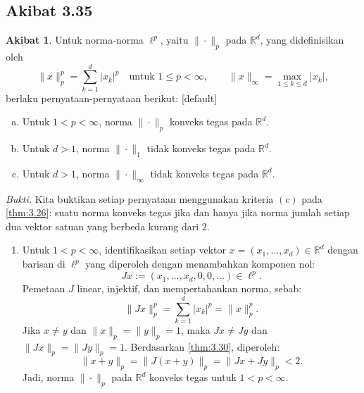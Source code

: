 \documentclass[aspectratio=169,11pt]{beamer}
\theoremstyle{definition}
\newtheorem{akibat}{Akibat}
\newcommand{\myref}[1]{\hyperref[#1]{\nameCref{#1} \ref*{#1}}}
\newcommand{\R}{\mathbb{R}}
\begin{document}
\subsection{Akibat 3.35}

\begin{frame}[allowframebreaks=1]{\insertsection}{\insertsubsection}
  \setcounter{akibat}{34}
  \begin{akibat}\label{cor:3.35}
    Untuk norma-norma $\ell^p$, yaitu $\|\cdot\|_p$ pada $\R^d$, yang didefinisikan oleh
    \begin{equation*}
      \|x\|_p^p=\sum_{k=1}^{d}|x_k|^p \quad \text{untuk } 1\leq p<\infty,
      \qquad \|x\|_\infty=\max_{1\leq k\leq d}|x_k|,
    \end{equation*}
    berlaku pernyataan-pernyataan berikut:
    [default]
    \begin{enumerate}[(a)]
      \item Untuk $1<p<\infty$, norma $\|\cdot\|_p$ konveks tegas pada $\R^d$.
      \item Untuk $d>1$, norma $\|\cdot\|_1$ tidak konveks tegas pada $\R^d$.
      \item Untuk $d>1$, norma $\|\cdot\|_\infty$ tidak konveks tegas pada $\R^d$.
    \end{enumerate}
  \end{akibat}

  \textit{Bukti.}
  Kita buktikan setiap pernyataan menggunakan kriteria $(c)$ pada \myref{thm:3.26}: suatu norma konveks tegas jika dan hanya jika norma jumlah setiap dua vektor satuan yang berbeda kurang dari $2$.

  \begin{enumerate}[a]
    \item Untuk $1<p<\infty$, identifikasikan setiap vektor $x=(x_1,\dots,x_d)\in\R^d$ dengan barisan di $\ell^p$ yang diperoleh dengan menambahkan komponen nol:
          \begin{equation*}
            Jx:=(x_1,\dots,x_d,0,0,\dots)\in\ell^p.
          \end{equation*}
          Pemetaan $J$ linear, injektif, dan mempertahankan norma, sebab:
          \begin{equation*}
            \|Jx\|_p^p=\sum_{k=1}^{d}|x_k|^p=\|x\|_p^p.
          \end{equation*}
          Jika $x\neq y$ dan $\|x\|_p=\|y\|_p=1$, maka $Jx\neq Jy$ dan $\|Jx\|_p=\|Jy\|_p=1$. Berdasarkan \myref{thm:3.30}, diperoleh:
          \begin{equation*}
            \|x+y\|_p=\|J(x+y)\|_p=\|Jx+Jy\|_p<2.
          \end{equation*}
          Jadi, norma $\|\cdot\|_p$ pada $\R^d$ konveks tegas untuk $1<p<\infty$.


\end{enumerate}
\end{frame}
\end{document}
